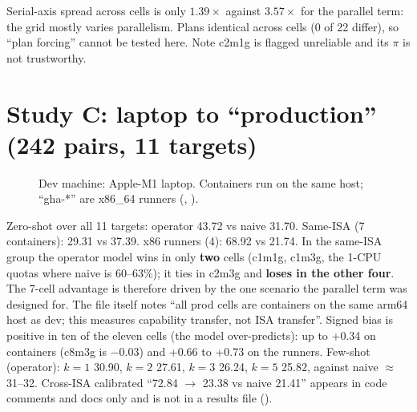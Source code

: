 Serial-axis spread across cells is only $1.39\times$ against $3.57\times$ for the parallel term: the grid mostly varies parallelism. Plans identical across cells (0 of 22 differ), so ``plan forcing'' cannot be tested here. Note c2m1g is flagged unreliable and its $\pi$ is not trustworthy.

\section{Study C: laptop to ``production'' (242 pairs, 11 targets)}
\begin{figure}[ht]
\centering
{}
\caption{Dev machine: Apple-M1 laptop. Containers run on the same host; ``gha-*'' are x86\_64 runners (, \evFILE).}
\label{fig:l2p}
\end{figure}
Zero-shot over all 11 targets: operator 43.72 vs naive 31.70. Same-ISA (7 containers): 29.31 vs 37.39. x86 runners (4): 68.92 vs 21.74. In the same-ISA group the operator model wins in only \textbf{two} cells (c1m1g, c1m3g, the 1-CPU quotas where naive is 60--63\%); it ties in c2m3g and \textbf{loses in the other four}. The 7-cell advantage is therefore driven by the one scenario the parallel term was designed for. The file itself notes ``all prod cells are containers on the same arm64 host as dev; this measures capability transfer, not ISA transfer''. Signed bias is positive in ten of the eleven cells (the model over-predicts): up to +0.34 on containers (c8m3g is $-0.03$) and +0.66 to +0.73 on the runners.
Few-shot (operator): $k{=}1$ 30.90, $k{=}2$ 27.61, $k{=}3$ 26.24, $k{=}5$ 25.82, against naive $\approx$31--32. Cross-ISA calibrated ``72.84 $\to$ 23.38 vs naive 21.41'' appears in code comments and docs only and is not in a results file (\evCLAIM).

